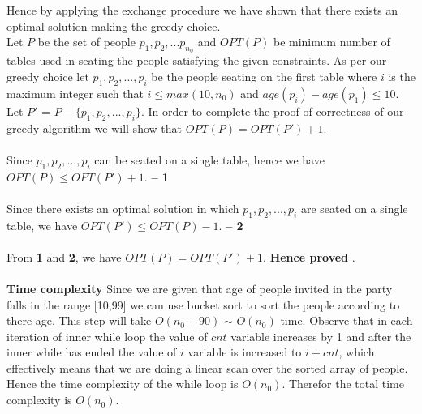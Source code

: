 \documentclass[a4paper]{article}
\begin{document}
Hence by applying the exchange procedure we have shown that there exists an optimal solution making the greedy choice. \\

Let $P$ be the set of people $p_{1},p_{2},...p_{n_{0}}$ and $OPT(P)$ be minimum number of tables used in seating the people satisfying the given constraints. As per our greedy choice let  $p_{1},p_{2},...,p_{i}$ be the people seating on the first table where $i$ is the maximum integer such that $ i \leq max(10,n_{0})$ and $age(p_{i})-age(p_{1}) \leq 10$. Let $P'$ = $P - \{ p_{1},p_{2},...,p_{i}\}$.  In order to complete the proof of correctness of our greedy algorithm we will show that $OPT(P) = OPT(P') + 1$. \\ \\
Since $p_{1},p_{2},...,p_{i}$  can be seated on a single table, hence we have $OPT(P) \leq OPT(P') + 1$. \textbf{ -- 1} \\ \\
Since there exists an optimal solution in which $p_{1},p_{2},...,p_{i}$  are seated on a single table, we have $OPT(P') \leq OPT(P) - 1$. \textbf{ -- 2} \\ \\
From \textbf{1} and \textbf{2}, we have $OPT(P) = OPT(P') + 1$. \textbf{Hence proved} .
\\ \\
\textbf{Time complexity} Since we are given that age of people invited in the party falls in the range [10,99] we can use bucket sort to sort the people according to there age. This step will take $O(n_{0} + 90)$ $\sim$ $O(n_{0})$ time. Observe that in each iteration of inner while loop the value of $cnt$ variable increases by 1 and after the inner while has ended the value of $i$ variable is increased to $i+cnt$, which effectively means that we are doing a linear scan over the sorted array of people. Hence the time complexity of the while loop is $O(n_{0})$. Therefor the total time complexity is $O(n_{0})$.
\end{document}
